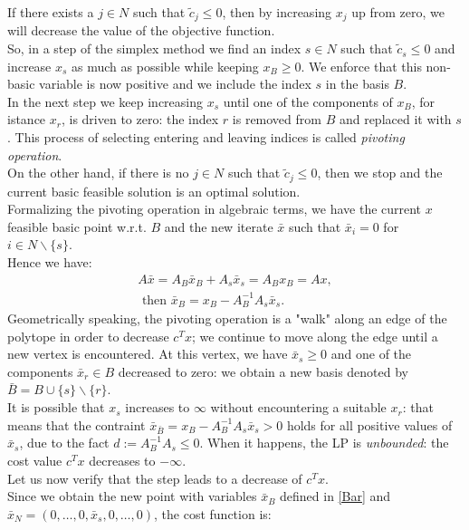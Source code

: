 \documentclass[a4paper,10 pt,titlepage,twoside]{book}
\theoremstyle{plain}
\theoremstyle{definition}
\theoremstyle{remark}
\begin{document}
 If there exists a $j \in N$ such that $\widetilde{c}_{j} \leq 0$, then by increasing $x_{j}$ up from zero, we will decrease the value of the objective function.\\
So, in a step of the simplex method we find an index $s \in N$ such that $\widetilde{c}_{s} \leq 0$ and increase $x_{s}$ as much as possible while keeping $x_{B} \geq 0$. We enforce that this non-basic variable is now positive and we include the index $s$ in the basis $B$.\\
In the next step we keep increasing $x_{s}$ until one of the components of $x_{B}$, for istance $x_{r}$, is driven to zero: the index $r$ is removed from $B$ and replaced it with $s$. This process of selecting entering and leaving indices is called \textit{pivoting operation}. \\
On the other hand, if there is no $j \in N$ such that $\widetilde{c}_{j} \leq 0$, then we stop and the current basic feasible solution is an optimal solution. \\
Formalizing the pivoting operation in algebraic terms, we have the current $x$ feasible basic point w.r.t. $B$ and the new iterate $\bar{x}$ such that $\bar{x}_{i} = 0$ for $i \in N\backslash\{s\}$.\\
Hence we have: 
\begin{align}
	A\bar{x} = A_{B}\bar{x}_{B} +A_{s}\bar{x}_{s} = A_{B}x_{B} = Ax,\\
	\text{  then }
	\bar{x}_{B} = x_{B} - A_{B}^{-1}A_{s}\bar{x}_{s}\label{Bar}.
\end{align}
Geometrically speaking, the pivoting operation is a "walk" along an edge of the polytope in order to decrease $c^{T}x$; we continue to move along the edge until a new vertex is encountered. At this vertex, we have $\bar{x}_{s}\geq0$ and one of the components $\bar{x}_{r}\in B$ decreased to zero: we obtain a new basis denoted by $\bar{B} = B \cup \{s\} \backslash \{r\}$.\\
It is possible that $x_{s}$ increases to $\infty$ without encountering a suitable $x_{r}$: that means that the contraint $\bar{x}_{\bar{B}} = x_{B} - A_{B}^{-1}A_{s}\bar{x}_{s}>0$ holds for all positive values of $\bar{x}_{s}$, due to the fact $d := A_{B}^{-1}A_{s}\leq0$. When it happens, the LP is \textit{unbounded}: the cost value $c^{T}x$ decreases to $-\infty$.\\[0.5cm]
Let us now verify that the step leads to a decrease of $c^{T}x$.\\
Since we obtain the new point with variables $\bar{x}_{B}$ defined in \ref{Bar} and $\bar{x}_{N}=(0,\dots, 0, \bar{x}_{s}, 0,\dots, 0)$, the cost function is:
\end{document}
